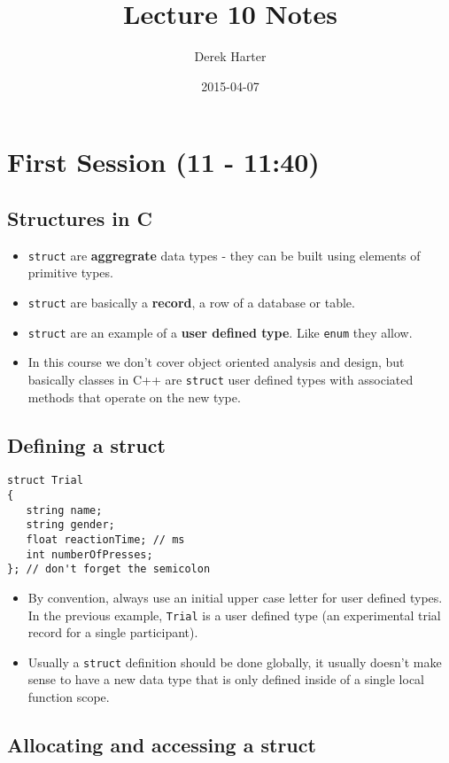 \documentclass[11pt]{article}
\title{Lecture 10 Notes}
\author{Derek Harter}
\date{2015-04-07}
\begin{document}
\maketitle


\section{First Session (11 - 11:40)}
\label{sec-1}
\subsection{Structures in C}
\label{sec-1-1}

\begin{itemize}
\item \verb~struct~ are \textbf{aggregrate} data types - they can be built using
  elements of primitive types.
\item \verb~struct~ are basically a \textbf{record}, a row of a database or table.
\item \verb~struct~ are an example of a \textbf{user defined type}.  Like \verb~enum~ they
  allow.
\item In this course we don't cover object oriented analysis and design,
  but basically classes in C++ are \verb~struct~ user defined types with
  associated methods that operate on the new type.
\end{itemize}
\subsection{Defining a struct}
\label{sec-1-2}



\begin{verbatim}
struct Trial
{
   string name;
   string gender;
   float reactionTime; // ms
   int numberOfPresses;
}; // don't forget the semicolon
\end{verbatim}

\begin{itemize}
\item By convention, always use an initial upper case letter for user
  defined types.  In the previous example, \verb~Trial~ is a user defined
  type (an experimental trial record for a single participant).
\item Usually a \verb~struct~ definition should be done globally, it usually
  doesn't make sense to have a new data type that is only defined
  inside of a single local function scope.
\end{itemize}
\subsection{Allocating and accessing a struct}
\label{sec-1-3}
\end{document}
